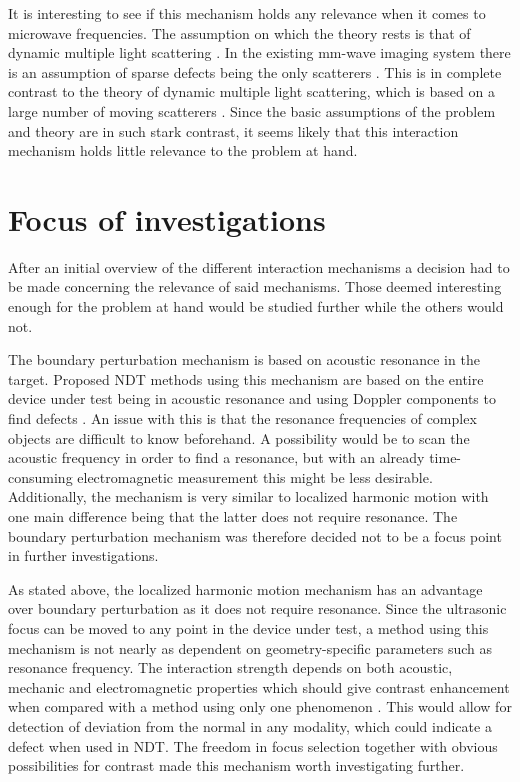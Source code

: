 \documentclass[10pt,a4paper,twocolumn,draft]{scrartcl}
\begin{document}
	It is interesting to see if this mechanism holds any relevance when it comes to microwave frequencies. The assumption on which the theory rests is that of dynamic multiple light scattering \cite{Leutz1995}. In the existing mm-wave imaging system there is an assumption of sparse defects being the only scatterers \cite{Helander2017}. This is in complete contrast to the theory of dynamic multiple light scattering, which is based on a large number of moving scatterers \cite{Leutz1995}. Since the basic assumptions of the problem and theory are in such stark contrast, it seems likely that this interaction mechanism holds little relevance to the problem at hand.
	
	\section{Focus of investigations}
	After an initial overview of the different interaction mechanisms a decision had to be made concerning the relevance of said mechanisms. Those deemed interesting enough for the problem at hand would be studied further while the others would not.
	
	The boundary perturbation mechanism is based on acoustic resonance in the target. Proposed NDT methods using this mechanism are based on the entire device under test being in acoustic resonance and using Doppler components to find defects \cite{Buerkle2009}. An issue with this is that the resonance frequencies of complex objects are difficult to know beforehand. A possibility would be to scan the acoustic frequency in order to find a resonance, but with an already time-consuming electromagnetic measurement this might be less desirable. Additionally, the mechanism is very similar to localized harmonic motion with one main difference being that the latter does not require resonance. The boundary perturbation mechanism was therefore decided not to be a focus point in further investigations.
	
	As stated above, the localized harmonic motion mechanism has an advantage over boundary perturbation as it does not require resonance. Since the ultrasonic focus can be moved to any point in the device under test, a method using this mechanism is not nearly as dependent on geometry-specific parameters such as resonance frequency. The interaction strength depends on both acoustic, mechanic and electromagnetic properties which should give contrast enhancement when compared with a method using only one phenomenon \cite{Top2016}. This would allow for detection of deviation from the normal in any modality, which could indicate a defect when used in NDT. The freedom in focus selection together with obvious possibilities for contrast made this mechanism worth investigating further.
	
\end{document}
